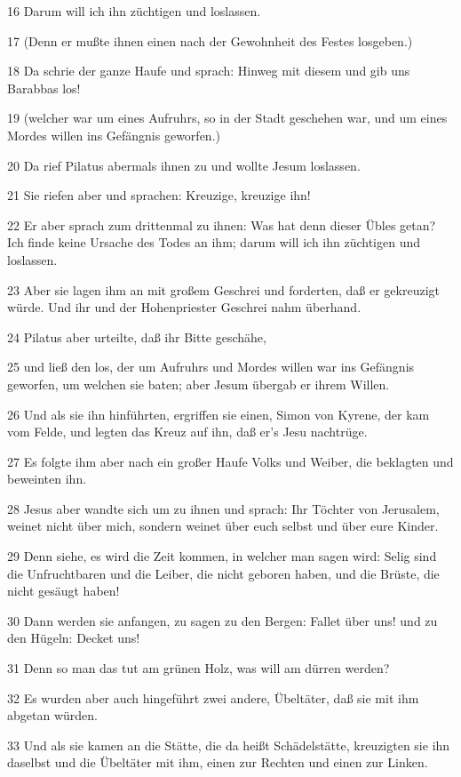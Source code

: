 \par 16 Darum will ich ihn züchtigen und loslassen.
\par 17 (Denn er mußte ihnen einen nach der Gewohnheit des Festes losgeben.)
\par 18 Da schrie der ganze Haufe und sprach: Hinweg mit diesem und gib uns Barabbas los!
\par 19 (welcher war um eines Aufruhrs, so in der Stadt geschehen war, und um eines Mordes willen ins Gefängnis geworfen.)
\par 20 Da rief Pilatus abermals ihnen zu und wollte Jesum loslassen.
\par 21 Sie riefen aber und sprachen: Kreuzige, kreuzige ihn!
\par 22 Er aber sprach zum drittenmal zu ihnen: Was hat denn dieser Übles getan? Ich finde keine Ursache des Todes an ihm; darum will ich ihn züchtigen und loslassen.
\par 23 Aber sie lagen ihm an mit großem Geschrei und forderten, daß er gekreuzigt würde. Und ihr und der Hohenpriester Geschrei nahm überhand.
\par 24 Pilatus aber urteilte, daß ihr Bitte geschähe,
\par 25 und ließ den los, der um Aufruhrs und Mordes willen war ins Gefängnis geworfen, um welchen sie baten; aber Jesum übergab er ihrem Willen.
\par 26 Und als sie ihn hinführten, ergriffen sie einen, Simon von Kyrene, der kam vom Felde, und legten das Kreuz auf ihn, daß er's Jesu nachtrüge.
\par 27 Es folgte ihm aber nach ein großer Haufe Volks und Weiber, die beklagten und beweinten ihn.
\par 28 Jesus aber wandte sich um zu ihnen und sprach: Ihr Töchter von Jerusalem, weinet nicht über mich, sondern weinet über euch selbst und über eure Kinder.
\par 29 Denn siehe, es wird die Zeit kommen, in welcher man sagen wird: Selig sind die Unfruchtbaren und die Leiber, die nicht geboren haben, und die Brüste, die nicht gesäugt haben!
\par 30 Dann werden sie anfangen, zu sagen zu den Bergen: Fallet über uns! und zu den Hügeln: Decket uns!
\par 31 Denn so man das tut am grünen Holz, was will am dürren werden?
\par 32 Es wurden aber auch hingeführt zwei andere, Übeltäter, daß sie mit ihm abgetan würden.
\par 33 Und als sie kamen an die Stätte, die da heißt Schädelstätte, kreuzigten sie ihn daselbst und die Übeltäter mit ihm, einen zur Rechten und einen zur Linken.
